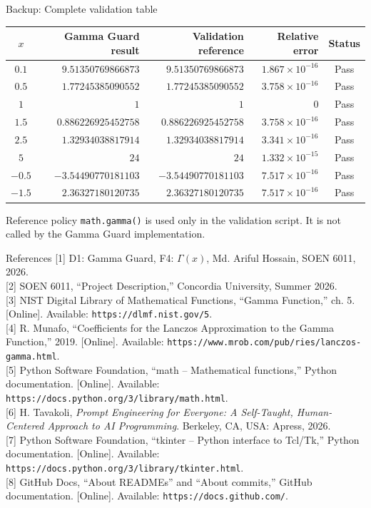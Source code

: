 \documentclass[10pt,aspectratio=169]{beamer}
\newcommand{\smallnote}[1]{\vspace{0.2em}{\scriptsize\textcolor{linegray}{#1}}}
\begin{document}
\begin{frame}{Backup: Complete validation table}
\tiny
\renewcommand{\arraystretch}{1.12}
\begin{tabularx}{\textwidth}{c r r r c}
\toprule
$x$ & Gamma Guard result & Validation reference & Relative error & Status \\
\midrule
$0.1$ & $9.51350769866873$ & $9.51350769866873$ & $1.867\times10^{-16}$ & Pass \\
$0.5$ & $1.77245385090552$ & $1.77245385090552$ & $3.758\times10^{-16}$ & Pass \\
$1$ & $1$ & $1$ & $0$ & Pass \\
$1.5$ & $0.886226925452758$ & $0.886226925452758$ & $3.758\times10^{-16}$ & Pass \\
$2.5$ & $1.32934038817914$ & $1.32934038817914$ & $3.341\times10^{-16}$ & Pass \\
$5$ & $24$ & $24$ & $1.332\times10^{-15}$ & Pass \\
$-0.5$ & $-3.54490770181103$ & $-3.54490770181103$ & $7.517\times10^{-16}$ & Pass \\
$-1.5$ & $2.36327180120735$ & $2.36327180120735$ & $7.517\times10^{-16}$ & Pass \\
\bottomrule
\end{tabularx}
\vspace{0.5em}
\begin{block}{Reference policy}
\texttt{math.gamma()} is used only in the validation script. It is not called by the Gamma Guard implementation.
\end{block}
\vfill\smallnote{Sources: [3], [5].}
\end{frame}

\begin{frame}{References}
\tiny
[1] D1: Gamma Guard, F4: $\Gamma(x)$, Md. Ariful Hossain, SOEN 6011, 2026.\\[0.35em]
[2] SOEN 6011, ``Project Description,'' Concordia University, Summer 2026.\\[0.35em]
[3] NIST Digital Library of Mathematical Functions, ``Gamma Function,'' ch. 5. [Online]. Available: \texttt{https://dlmf.nist.gov/5}.\\[0.35em]
[4] R. Munafo, ``Coefficients for the Lanczos Approximation to the Gamma Function,'' 2019. [Online]. Available: \texttt{https://www.mrob.com/pub/ries/lanczos-gamma.html}.\\[0.35em]
[5] Python Software Foundation, ``math -- Mathematical functions,'' Python documentation. [Online]. Available: \texttt{https://docs.python.org/3/library/math.html}.\\[0.35em]
[6] H. Tavakoli, \emph{Prompt Engineering for Everyone: A Self-Taught, Human-Centered Approach to AI Programming}. Berkeley, CA, USA: Apress, 2026.\\[0.35em]
[7] Python Software Foundation, ``tkinter -- Python interface to Tcl/Tk,'' Python documentation. [Online]. Available: \texttt{https://docs.python.org/3/library/tkinter.html}.\\[0.35em]
[8] GitHub Docs, ``About READMEs'' and ``About commits,'' GitHub documentation. [Online]. Available: \texttt{https://docs.github.com/}.
\end{frame}
\end{document}
